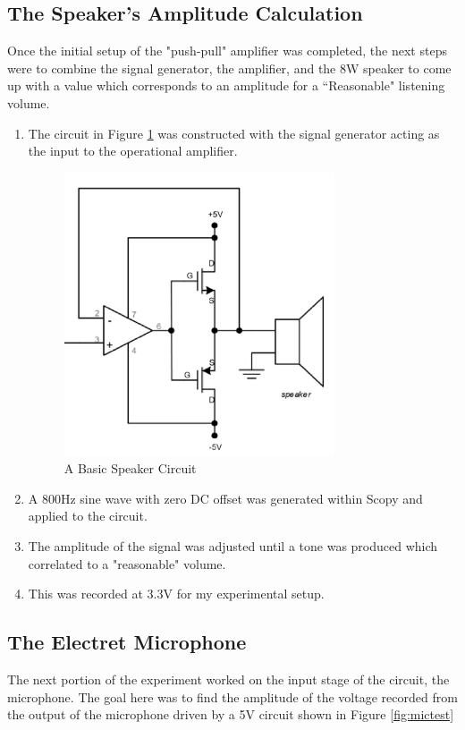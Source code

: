 \documentclass[12pt]{article}
\begin{document}
\subsection{The Speaker's Amplitude Calculation}
Once the initial setup of the "push-pull" amplifier was completed, the next
steps were to combine the signal generator, the amplifier, and the 8W speaker to
come up with a value which corresponds to an amplitude for a ``Reasonable"
listening volume.
\begin{enumerate}


	\item The circuit in Figure \ref{fig:speakertest} was constructed with the signal
	      generator acting as the input to the operational amplifier.
	      \begin{figure}[H]
		      \centering
		      \includegraphics[width=8cm]{04_07}
		      \caption{A Basic Speaker Circuit}
		      \label{fig:speakertest}
	      \end{figure}
	\item A 800Hz sine wave with zero DC offset was generated within Scopy and
	      applied to the circuit.
	\item The amplitude of the signal was adjusted until a tone was produced
	      which correlated to a "reasonable" volume.
	\item This was recorded at 3.3V for my experimental setup.
\end{enumerate}
\subsection{The Electret Microphone}
The next portion of the experiment worked on the input stage of the circuit, the
microphone. The goal here was to find the amplitude of the voltage recorded from
the output of the microphone driven by a 5V circuit shown in Figure
\ref{fig:mictest}
\end{document}

